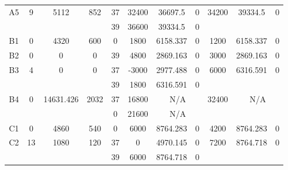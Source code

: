 \begin{sidewaystable}
\begin{tabular}{c||c|c|c||c|c|c|c||c|c|c}
        
      \\
      \hline
      \multirow{2}{*}{A5} &
      \multirow{2}{*}{9} &
      \multirow{2}{*}{5112} &
      \multirow{2}{*}{852} &
      37 &
      32400 &
        36697.5 &
        0 &
      \multirow{2}{*}{34200} &
        \multirow{2}{*}{39334.5} &
        \multirow{2}{*}{0}
      \\
      \cline{5-8}
       &
       &
       &
       &
      39 &
      36600 &
        39334.5 &
        0 &
      
         &
        
      \\
      \hline
      \multirow{1}{*}{B1} &
      \multirow{1}{*}{0} &
      \multirow{1}{*}{4320} &
      \multirow{1}{*}{600} &
      0 &
      1800 &
        6158.337 &
        0 &
      \multirow{1}{*}{1200} &
        \multirow{1}{*}{6158.337} &
        \multirow{1}{*}{0}
      \\
      \hline
      \multirow{1}{*}{B2} &
      \multirow{1}{*}{0} &
      \multirow{1}{*}{0} &
      \multirow{1}{*}{0} &
      39 &
      4800 &
        2869.163 &
        0 &
      \multirow{1}{*}{3000} &
        \multirow{1}{*}{2869.163} &
        \multirow{1}{*}{0}
      \\
      \hline
      \multirow{2}{*}{B3} &
      \multirow{2}{*}{4} &
      \multirow{2}{*}{0} &
      \multirow{2}{*}{0} &
      37 &
      -3000 &
        2977.488 &
        0 &
      \multirow{2}{*}{6000} &
        \multirow{2}{*}{6316.591} &
        \multirow{2}{*}{0}
      \\
      \cline{5-8}
       &
       &
       &
       &
      39 &
      1800 &
        6316.591 &
        0 &
      
         &
        
      \\
      \hline
      \multirow{2}{*}{B4} &
      \multirow{2}{*}{0} &
      \multirow{2}{*}{14631.426} &
      \multirow{2}{*}{2032} &
      37 &
      16800 &
        \multicolumn{2}{|c||}{N/A} &
      \multirow{2}{*}{32400} &
        \multicolumn{2}{c}{\multirow{2}{*}{N/A}}
      \\
      \cline{5-8}
       &
       &
       &
       &
      0 &
      21600 &
        \multicolumn{2}{|c||}{N/A} &
      
        
      \\
      \hline
      \multirow{1}{*}{C1} &
      \multirow{1}{*}{0} &
      \multirow{1}{*}{4860} &
      \multirow{1}{*}{540} &
      0 &
      6000 &
        8764.283 &
        0 &
      \multirow{1}{*}{4200} &
        \multirow{1}{*}{8764.283} &
        \multirow{1}{*}{0}
      \\
      \hline
      \multirow{2}{*}{C2} &
      \multirow{2}{*}{13} &
      \multirow{2}{*}{1080} &
      \multirow{2}{*}{120} &
      37 &
      0 &
        4970.145 &
        0 &
      \multirow{2}{*}{7200} &
        \multirow{2}{*}{8764.718} &
        \multirow{2}{*}{0}
      \\
      \cline{5-8}
       &
       &
       &
       &
      39 &
      6000 &
        8764.718 &
        0 &
      

\end{tabular}
\end{sidewaystable}
